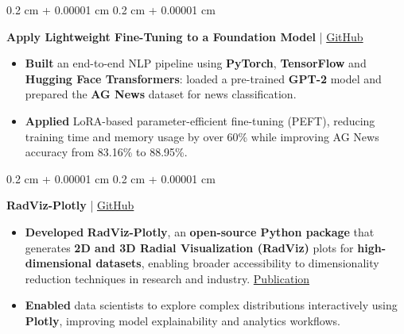 \documentclass[10pt, letterpaper]{article}
\newenvironment{highlights}{
    \begin{itemize}[
        topsep=0.10 cm,
        parsep=0.10 cm,
        partopsep=0pt,
        itemsep=0pt,
        leftmargin=0.4 cm + 10pt
    ]
}{
    \end{itemize}
} %
\newenvironment{onecolentry}{
    \begin{adjustwidth}{
        0.2 cm + 0.00001 cm
    }{
        0.2 cm + 0.00001 cm
    }
}{
    \end{adjustwidth}
} %
\let\hrefWithoutArrow\href
\renewcommand{\href}[2]{\hrefWithoutArrow{#1}{#2}}
\begin{document}
\begin{onecolentry}
\textbf{Apply Lightweight Fine-Tuning to a Foundation Model} | \href{https://github.com/elewah/Apply-Lightweight-Fine-Tuning-to-a-Foundation-Model}{GitHub}
\begin{highlights}

\item \textbf{Built} an end-to-end NLP pipeline using \textbf{PyTorch}, \textbf{TensorFlow} and \textbf{Hugging Face Transformers}: loaded a pre-trained \textbf{GPT-2} model and prepared the \textbf{AG News} dataset for news classification.

\item \textbf{Applied} LoRA-based parameter-efficient fine-tuning (PEFT), reducing training time and memory usage by over 60\% while improving AG News accuracy from 83.16\% to 88.95\%.


\end{highlights}
\end{onecolentry}


\begin{onecolentry}
    \textbf{RadViz-Plotly} | \href{https://github.com/elewah/RadViz-Plotly}{GitHub}
    \begin{highlights}
        \item \textbf{Developed} \textbf{RadViz-Plotly}, an \textbf{open-source Python package} that generates \textbf{2D and 3D Radial Visualization (RadViz)} plots for \textbf{high-dimensional datasets}, enabling broader accessibility to dimensionality reduction techniques in research and industry. \href{https://ieeexplore.ieee.org/document/9504983}{Publication}
        
        \item \textbf{Enabled} data scientists to explore complex distributions interactively using \textbf{Plotly}, improving model explainability and analytics workflows.
    \end{highlights}
\end{onecolentry}
\end{document}
